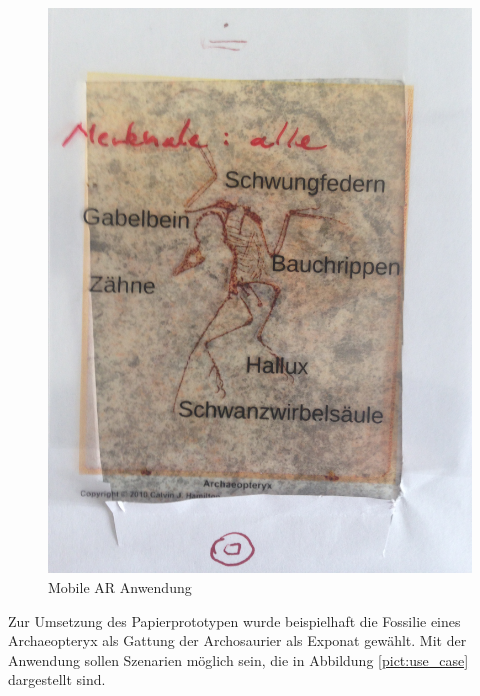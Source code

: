 \documentclass[runningheads,a4paper, 12pt]{llncs}
\begin{document}
\begin{figure}[H]
	\centering
	\includegraphics[angle=-90,scale=0.04]{proto}
	\caption{Mobile AR Anwendung}
	\label{fig:prototype}
\end{figure} 

Zur Umsetzung des Papierprototypen wurde beispielhaft die Fossilie eines Archaeopteryx als Gattung der Archosaurier als Exponat gewählt. Mit der Anwendung sollen Szenarien möglich sein, die in Abbildung \ref{pict:use_case} dargestellt sind.
\end{document}
